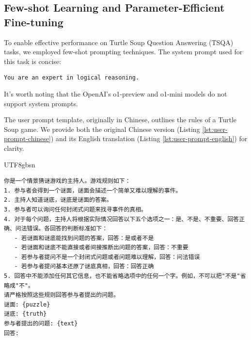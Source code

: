 \documentclass[conference]{IEEEtran}
\begin{document}
\subsection{Few-shot Learning and Parameter-Efficient Fine-tuning}

To enable effective performance on Turtle Soup Question Answering (TSQA) tasks, we employed few-shot prompting techniques. The system prompt used for this task is concise:

\begin{verbatim}
You are an expert in logical reasoning.
\end{verbatim}

It's worth noting that the OpenAI's o1-preview and o1-mini models do not support system prompts.

The user prompt template, originally in Chinese, outlines the rules of a Turtle Soup game. We provide both the original Chinese version (Listing \ref{lst:user-prompt-chinese}) and its English translation (Listing \ref{lst:user-prompt-english}) for clarity.


\begin{CJK*}{UTF8}{gbsn}
\begin{listing}[htbp]
\small{
\begin{verbatim}
你是一个情景猜谜游戏的主持人。游戏规则如下：
1. 参与者会得到一个谜面，谜面会描述一个简单又难以理解的事件。
2. 主持人知道谜底，谜底是谜面的答案。
3. 参与者可以询问任何封闭式问题来找寻事件的真相。
4. 对于每个问题，主持人将根据实际情况回答以下五个选项之一：是、不是、不重要、回答正确、问法错误。各回答的判断标准如下：
   - 若谜面和谜底能找到问题的答案，回答：是或者不是
   - 若谜面和谜底不能直接或者间接推断出问题的答案，回答：不重要
   - 若参与者提问不是一个封闭式问题或者问题难以理解，回答：问法错误
   - 若参与者提问基本还原了谜底真相，回答：回答正确
5. 回答中不能添加任何其它信息，也不能省略选项中的任何一个字。例如，不可以把"不是"省略成"不"。
请严格按照这些规则回答参与者提出的问题。
谜面: {puzzle}
谜底: {truth}
参与者提出的问题: {text}
回答: 
\end{verbatim}
}
\caption{User Prompt Template for TSQA (Chinese)}
\label{lst:user-prompt-chinese}
\end{listing}
\end{CJK*}
\end{document}
